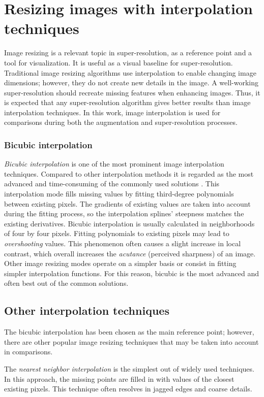 \section{Resizing images with interpolation techniques}
Image resizing is a relevant topic in super-resolution, as a reference point and a tool for visualization.
It is useful as a visual baseline for super-resolution.
Traditional image resizing algorithms use interpolation to enable changing image dimensions; however, they do not create new details in the image.
A well-working super-resolution should recreate missing features when enhancing images.
Thus, it is expected that any super-resolution algorithm gives better results than image interpolation techniques.
In this work, image interpolation is used for comparisons during both the augmentation and super-resolution processes.

\subsubsection{Bicubic interpolation}
\textit{Bicubic interpolation} is one of the most prominent image interpolation techniques.
Compared to other interpolation methods it is regarded as the most advanced and time-consuming of the commonly used solutions \cite{han-2013-interpolation, teoh-2008-inrepolation}.
This interpolation mode fills missing values by fitting third-degree polynomials between existing pixels.
The gradients of existing values are taken into account during the fitting process, so the interpolation splines' steepness matches the existing derivatives.
Bicubic interpolation is usually calculated in neighborhoods of four by four pixels.
Fitting polynomials to existing pixels may lead to \textit{overshooting} values.
This phenomenon often causes a slight increase in local contrast, which overall increases the \textit{acutance} (perceived sharpness) of an image.
Other image resizing modes operate on a simpler basis or consist in fitting simpler interpolation functions.
For this reason, bicubic is the most advanced and often best out of the common solutions.

\subsection{Other interpolation techniques}
The bicubic interpolation has been chosen as the main reference point; however, there are other popular image resizing techniques that may be taken into account in comparisons.

The \textit{nearest neighbor interpolation} is the simplest out of widely used techniques.
In this approach, the missing points are filled in with values of the closest existing pixels.
This technique often resolves in jagged edges and coarse details.


